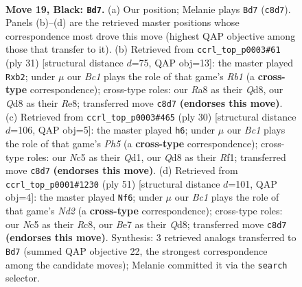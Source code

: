 \documentclass[11pt]{article}
\begin{document}
\begin{figure}[p]\centering
\begin{subfigure}{0.46\textwidth}\centering
\resizebox{\linewidth}{!}{%
\newchessgame
\chessboard[
  setfen={rnbqkr2/p3b2Q/1p4p1/1Bnp2P1/P7/2N2N2/1P3P2/R1B1K2R b KQ - 5 19},
  showmover=false,
  pgfstyle=straightmove, color=movearrow, markmove={c8-d7}
]}
\caption{}
\end{subfigure}\hfill
\begin{subfigure}{0.46\textwidth}\centering
\resizebox{\linewidth}{!}{%
\newchessgame
\chessboard[
  setfen={1r1qr1k1/p2bbppp/Q2p4/8/4PBn1/2N5/PPP1B1PP/R4R1K b - - 2 16},
  showmover=false,
  pgfstyle=straightmove, color=movearrow, markmove={b8-b2}
]}
\caption{}
\end{subfigure}
\\[4pt]
\begin{subfigure}{0.46\textwidth}\centering
\resizebox{\linewidth}{!}{%
\newchessgame
\chessboard[
  setfen={rnr3k1/1R1bppbp/6p1/7P/p2PP3/5N2/q2BBPP1/3Q1RK1 w - - 0 16},
  showmover=false,
  pgfstyle=straightmove, color=movearrow, markmove={h5-h6}
]}
\caption{}
\end{subfigure}\hfill
\begin{subfigure}{0.46\textwidth}\centering
\resizebox{\linewidth}{!}{%
\newchessgame
\chessboard[
  setfen={2rqr1k1/1b1n1pb1/p5p1/3p3p/RP1P4/3B1NBP/5PP1/1Q1R2K1 b - - 0 26},
  showmover=false,
  pgfstyle=straightmove, color=movearrow, markmove={d7-f6}
]}
\caption{}
\end{subfigure}
\caption{\textbf{Move 19, Black: \texttt{Bd7}.} (a) Our position; Melanie plays \texttt{Bd7} (\texttt{c8d7}). Panels (b)--(d) are the retrieved master positions whose correspondence most drove this move (highest QAP objective among those that transfer to it). (b) Retrieved from \texttt{ccrl\_top\_p0003\#61} (ply 31) [structural distance $d$=75, QAP obj=13]: the master played \texttt{Rxb2}; under $\mu$ our \emph{Bc1} plays the role of that game's \emph{Rb1} (a \textbf{cross-type} correspondence); cross-type roles: our \emph{R}a8 as their \emph{Q}d8, our \emph{Q}d8 as their \emph{R}e8; transferred move \texttt{c8d7} \textbf{(endorses this move)}. (c) Retrieved from \texttt{ccrl\_top\_p0003\#465} (ply 30) [structural distance $d$=106, QAP obj=5]: the master played \texttt{h6}; under $\mu$ our \emph{Bc1} plays the role of that game's \emph{Ph5} (a \textbf{cross-type} correspondence); cross-type roles: our \emph{N}c5 as their \emph{Q}d1, our \emph{Q}d8 as their \emph{R}f1; transferred move \texttt{c8d7} \textbf{(endorses this move)}. (d) Retrieved from \texttt{ccrl\_top\_p0001\#1230} (ply 51) [structural distance $d$=101, QAP obj=4]: the master played \texttt{Nf6}; under $\mu$ our \emph{Bc1} plays the role of that game's \emph{Nd2} (a \textbf{cross-type} correspondence); cross-type roles: our \emph{N}c5 as their \emph{R}c8, our \emph{B}e7 as their \emph{Q}d8; transferred move \texttt{c8d7} \textbf{(endorses this move)}. Synthesis: 3 retrieved analogs transferred to \texttt{Bd7} (summed QAP objective 22, the strongest correspondence among the candidate moves); Melanie committed it via the \texttt{search} selector.}
\label{fig:thought-m37}
\end{figure}
\end{document}
